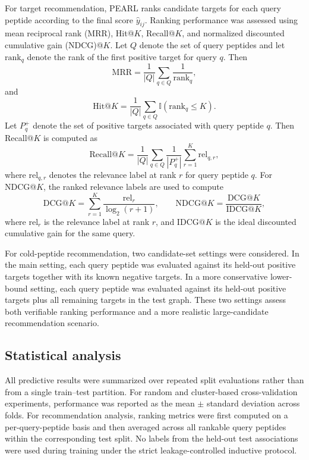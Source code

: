 For target recommendation, PEARL ranks candidate targets for each query peptide according to the final score $\hat{y}_{ij}$. Ranking performance was assessed using mean reciprocal rank (MRR), Hit@$K$, Recall@$K$, and normalized discounted cumulative gain (NDCG)@$K$. Let $Q$ denote the set of query peptides and let $\mathrm{rank}_{q}$ denote the rank of the first positive target for query $q$. Then
\begin{equation}
\mathrm{MRR}
=
\frac{1}{|Q|}
\sum_{q \in Q}
\frac{1}{\mathrm{rank}_{q}},
\end{equation}
and
\begin{equation}
\mathrm{Hit@}K
=
\frac{1}{|Q|}
\sum_{q \in Q}
\mathbb{I}(\mathrm{rank}_{q} \le K).
\end{equation}
Let $P_q^{+}$ denote the set of positive targets associated with query peptide $q$. Then Recall@$K$ is computed as
\begin{equation}
\mathrm{Recall@}K
=
\frac{1}{|Q|}
\sum_{q \in Q}
\frac{1}{|P_q^{+}|}
\sum_{r=1}^{K}
\mathrm{rel}_{q,r},
\end{equation}
where $\mathrm{rel}_{q,r}$ denotes the relevance label at rank $r$ for query peptide $q$.
For NDCG@$K$, the ranked relevance labels are used to compute
\begin{equation}
\mathrm{DCG@}K
=
\sum_{r=1}^{K}
\frac{\mathrm{rel}_{r}}{\log_{2}(r+1)},
\qquad
\mathrm{NDCG@}K
=
\frac{\mathrm{DCG@}K}{\mathrm{IDCG@}K},
\end{equation}
where $\mathrm{rel}_{r}$ is the relevance label at rank $r$, and $\mathrm{IDCG@}K$ is the ideal discounted cumulative gain for the same query.

For cold-peptide recommendation, two candidate-set settings were considered. In the main setting, each query peptide was evaluated against its held-out positive targets together with its known negative targets. In a more conservative lower-bound setting, each query peptide was evaluated against its held-out positive targets plus all remaining targets in the test graph. These two settings assess both verifiable ranking performance and a more realistic large-candidate recommendation scenario.

\subsection{Statistical analysis}

All predictive results were summarized over repeated split evaluations rather than from a single train--test partition. For random and cluster-based cross-validation experiments, performance was reported as the mean $\pm$ standard deviation across folds. For recommendation analysis, ranking metrics were first computed on a per-query-peptide basis and then averaged across all rankable query peptides within the corresponding test split. No labels from the held-out test associations were used during training under the strict leakage-controlled inductive protocol.

